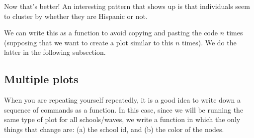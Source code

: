 \documentclass[
]{book}
\newenvironment{Shaded}{\begin{snugshade}}{\end{snugshade}}
\newcommand{\AttributeTok}[1]{\textcolor[rgb]{0.13,0.29,0.53}{#1}}
\newcommand{\CommentTok}[1]{\textcolor[rgb]{0.56,0.35,0.01}{\textit{#1}}}
\newcommand{\ConstantTok}[1]{\textcolor[rgb]{0.56,0.35,0.01}{#1}}
\newcommand{\ControlFlowTok}[1]{\textcolor[rgb]{0.13,0.29,0.53}{\textbf{#1}}}
\newcommand{\DecValTok}[1]{\textcolor[rgb]{0.00,0.00,0.81}{#1}}
\newcommand{\FunctionTok}[1]{\textcolor[rgb]{0.13,0.29,0.53}{\textbf{#1}}}
\newcommand{\NormalTok}[1]{#1}
\newcommand{\OtherTok}[1]{\textcolor[rgb]{0.56,0.35,0.01}{#1}}
\newcommand{\SpecialCharTok}[1]{\textcolor[rgb]{0.81,0.36,0.00}{\textbf{#1}}}
\newcommand{\StringTok}[1]{\textcolor[rgb]{0.31,0.60,0.02}{#1}}
\begin{document}
Now that's better! An interesting pattern that shows up is that individuals seem to cluster by whether they are Hispanic or not.

We can write this as a function to avoid copying and pasting the code \(n\) times (supposing that we want to create a plot similar to this \(n\) times). We do the latter in the following subsection.

\hypertarget{multiple-plots}{%
\subsection{Multiple plots}\label{multiple-plots}}

When you are repeating yourself repeatedly, it is a good idea to write down a sequence of commands as a function. In this case, since we will be running the same type of plot for all schools/waves, we write a function in which the only things that change are: (a) the school id, and (b) the color of the nodes.

\begin{Shaded}
\end{Shaded}
\end{document}
